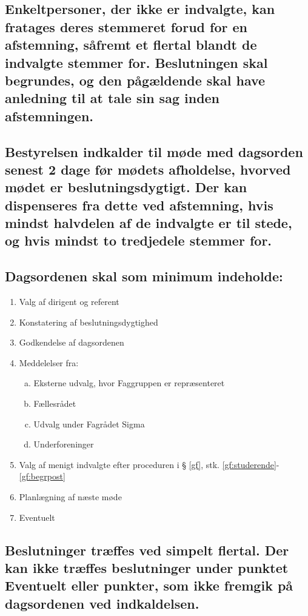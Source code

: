 \documentclass[10pt, danish]{article}
\begin{document}
	\subsection{Enkeltpersoner, der ikke er indvalgte, kan fratages deres stemmeret forud for en afstemning, såfremt et flertal blandt de indvalgte stemmer for. Beslutningen skal begrundes, og den pågældende skal have anledning til at tale sin sag inden afstemningen.}
	
	\subsection{Bestyrelsen indkalder til møde med dagsorden senest 2 dage før mødets afholdelse, hvorved mødet er beslutningsdygtigt. Der kan dispenseres fra dette ved afstemning, hvis mindst halvdelen af de indvalgte er til stede, og hvis mindst to tredjedele stemmer for.}\label{FRM:indkaldelse}
	
	\subsection{Dagsordenen skal som minimum indeholde:}\label{FRM:dagsorden}
	
	\begin{enumerate}[1), nosep]
		\item Valg af dirigent og referent
		\item Konstatering af beslutningsdygtighed
		\item Godkendelse af dagsordenen
		\item Meddelelser fra:
		\begin{enumerate}[a., nosep]
			\item Eksterne udvalg, hvor Faggruppen er repræsenteret
			\item Fællesrådet
			\item Udvalg under Fagrådet Sigma
			\item Underforeninger
		\end{enumerate}
		\item Valg af menigt indvalgte efter proceduren i § \ref{gf}, stk. \ref{gf:studerende}-\ref{gf:begrpost}
		\item Planlægning af næste møde
		\item Eventuelt
	\end{enumerate}
	
	\subsection{Beslutninger træffes ved simpelt flertal. Der kan ikke træffes beslutninger under punktet Eventuelt eller punkter, som ikke fremgik på dagsordenen ved indkaldelsen.}\label{FRM:beslutninger}
	
\end{document}
